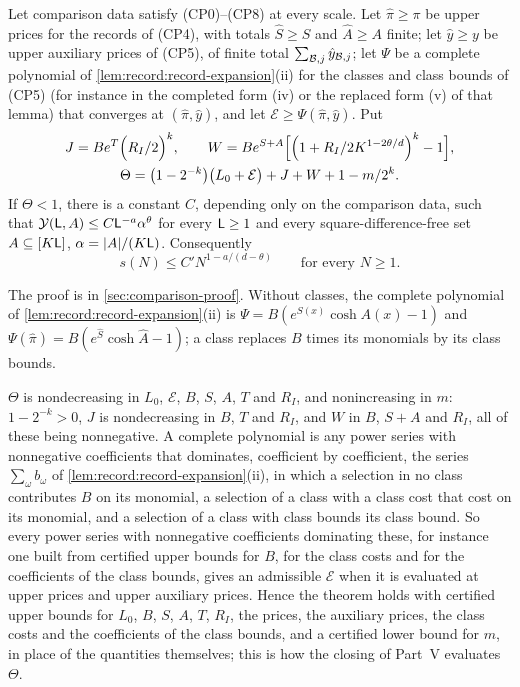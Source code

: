 \begin{theorem}\label{thm:comparison}
Let comparison data satisfy (CP0)--(CP8) at every scale. Let $\hat\pi\ge\pi$
be upper prices for the records of (CP4), with totals $\hat S\ge S$ and
$\hat A\ge A$ finite; let $\hat y\ge y$ be upper auxiliary prices of (CP5),
of finite total $\sum_{\mathcal B,j}\hat y_{\mathcal B,j}$; let $\Psi$ be a complete
polynomial of \cref{lem:record:record-expansion}(ii) for the classes and
class bounds of (CP5) (for instance in the completed form (iv) or the
replaced form (v) of that lemma) that converges at $(\hat\pi,\hat y)$, and
let $\mathcal E\ge\Psi(\hat\pi,\hat y)$. Put
\begin{gather*}
 J=Be^T\Bigl(R_I/2\Bigr)^k,\qquad
 W=Be^{S+A}\Bigl[\Bigl(1+R_I/2K^{1-2\theta/d}\Bigr)^k-1\Bigr],\\
 \Theta=\bigl(1-2^{-k}\bigr)\bigl(L_0+\mathcal E\bigr)+J+W+1-m/2^k.
\end{gather*}
If $\Theta<1$, there is a constant $C$, depending only on the
comparison data, such that $\mathcal Y(\mathsf L,A)\le
C\mathsf L^{-a}\alpha^\theta$ for every $\mathsf L\ge1$ and every square-difference-free
set $A\subseteq[K\mathsf L]$, $\alpha=|A|/(K\mathsf L)$. Consequently
\[
 s(N)\le C'N^{1-a/(d-\theta)}\qquad\text{for every }N\ge1 .
\]
\end{theorem}

The proof is in \cref{sec:comparison-proof}. Without classes, the complete
polynomial of \cref{lem:record:record-expansion}(ii) is
$\Psi=B(e^{S(x)}\cosh A(x)-1)$ and $\Psi(\hat\pi)=B(e^{\hat S}\cosh\hat
A-1)$; a class replaces $B$ times its monomials by its class bounds.

\begin{remark}[Monotonicity]\label{rem:cp:monotone}
$\Theta$ is nondecreasing in $L_0$, $\mathcal E$, $B$, $S$, $A$, $T$ and
$R_I$, and nonincreasing in $m$: $1-2^{-k}>0$, $J$ is nondecreasing in $B$,
$T$ and $R_I$, and $W$ in $B$, $S+A$ and $R_I$, all of these being
nonnegative. A complete polynomial is any power series with nonnegative
coefficients that dominates, coefficient by coefficient, the series
$\sum_\omega b_\omega$ of \cref{lem:record:record-expansion}(ii), in which a
selection in no class contributes $B$ on its monomial, a selection of a class
with a class cost that cost on its monomial, and a selection of a class with
class bounds its class bound. So every power series with nonnegative
coefficients dominating these, for instance one built from certified upper
bounds for $B$, for the class costs and for the coefficients of the class
bounds, gives an admissible $\mathcal E$ when it is evaluated at upper prices
and upper auxiliary prices. Hence the theorem holds with certified upper
bounds for $L_0$, $B$, $S$, $A$, $T$, $R_I$, the prices, the auxiliary prices,
the class costs and the coefficients of the class bounds, and a certified
lower bound for $m$, in place of the quantities themselves; this is how the
closing of Part~V evaluates $\Theta$.
\end{remark}

